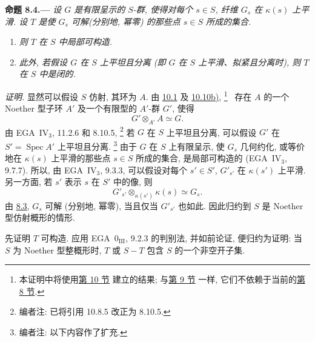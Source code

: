 
\medskip
{}\label{prop:sga3-VIB-8.4}%
\noindent\textbf{命题 8.4.---}
\emph{设 \(G\) 是有限呈示的 \(S\)-群,
使得对每个 \(s\in S\), 纤维 \(G_s\) 在 \(\kappa(s)\) 上平滑.
设 \(T\) 是使 \(G_s\) 可解\textup{(分别地, 幂零)} 的那些点 \(s\in S\) 所成的集合.}
\begin{enumerate}
\item[\textup{(i)}]\label{concl:sga3-VIB-8.4-i}
  \emph{则 \(T\) 在 \(S\) 中局部可构造.}

\item[\textup{(ii)}]\label{concl:sga3-VIB-8.4-ii}
  \emph{此外, 若假设 \(G\) 在 \(S\) 上平坦且分离
  \textup{(即 \(G\) 在 \(S\) 上平滑、拟紧且分离时)},
  则 \(T\) 在 \(S\) 中是闭的.}
\end{enumerate}

\emph{证明.}
显然可以假设 \(S\) 仿射, 其环为 \(A\).
由 \hyperref[par:sga3-VIB-10.1]{10.1} 及
\hyperref[par:sga3-VIB-10.10]{10.10\textup{b)}},%
\begingroup
\renewcommand{\thefootnote}{\fnsymbol{footnote}}%
\footnote[1]{\label{note:sga3-VIB-8.4-star}
本证明中将使用\hyperref[sec:sga3-VIB-10]{第 10 节} 建立的结果;
与\hyperref[sec:sga3-VIB-9]{第 9 节} 一样,
它们不依赖于当前的\hyperref[sec:sga3-VIB-8]{第 8 节}.}%
\endgroup\ 
存在 \(A\) 的一个 Noether 型子环 \(A'\)
及一个有限型的 \(A'\)-群 \(G'\), 使得
\[
  G'\otimes_{A'}A\simeq G.
\]
由 EGA~IV\(_3\), 11.2.6 和 8.10.5,%
\footnote{\label{note:sga3-VIB-82}编者注: 已将引用 10.8.5 改正为 8.10.5.}
若 \(G\) 在 \(S\) 上平坦且分离,
可以假设 \(G'\) 在 \(S'=\operatorname{Spec}A'\) 上平坦且分离.%
\footnote{\label{note:sga3-VIB-83}编者注: 以下内容作了扩充.}
由于 \(G\) 在 \(S\) 上有限呈示,
使 \(G_s\) 几何约化,
或等价地在 \(\kappa(s)\) 上平滑的那些点 \(s\in S\) 所成的集合,
是局部可构造的 (EGA~IV\(_3\), 9.7.7).
所以, 由 EGA~IV\(_3\), 9.3.3,
可以假设对每个 \(s'\in S'\), \(G'_{s'}\) 在 \(\kappa(s')\) 上平滑.
另一方面, 若 \(s'\) 表示 \(s\) 在 \(S'\) 中的像, 则
\[
  G'_{s'}\otimes_{\kappa(s')}\kappa(s)\simeq G_s.
\]
由 \hyperref[prop:sga3-VIB-8.3]{8.3},
\(G_s\) 可解 (分别地, 幂零), 当且仅当 \(G'_{s'}\) 也如此.
因此归约到 \(S\) 是 Noether 型仿射概形的情形.

先证明 \(T\) 可构造.
应用 EGA~0\(_{\mathrm{III}}\), 9.2.3 的判别法,
并如前论证, 便归约为证明:
当 \(S\) 为 Noether 型整概形时,
\(T\) 或 \(S-T\) 包含 \(S\) 的一个非空开子集.

